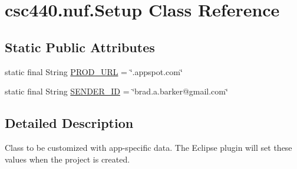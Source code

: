 \hypertarget{classcsc440_1_1nuf_1_1_setup}{\section{csc440.\-nuf.\-Setup Class Reference}
\label{classcsc440_1_1nuf_1_1_setup}
}
\subsection*{Static Public Attributes}
\begin{DoxyCompactItemize}
\item 
static final String \hyperlink{classcsc440_1_1nuf_1_1_setup_a2b9dcf3824dfea4980f2d9f8c9bdcf09}{P\-R\-O\-D\-\_\-\-U\-R\-L} = \char`\"{}.appspot.\-com\char`\"{}
\item 
static final String \hyperlink{classcsc440_1_1nuf_1_1_setup_a7a399cf5d77d0ea94c0cc2a091fc7c7d}{S\-E\-N\-D\-E\-R\-\_\-\-I\-D} = \char`\"{}brad.\-a.\-barker@gmail.\-com\char`\"{}
\end{DoxyCompactItemize}


\subsection{Detailed Description}
Class to be customized with app-\/specific data. The Eclipse plugin will set these values when the project is created. 

